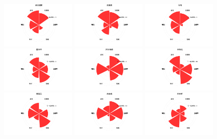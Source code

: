 \documentclass[12pt,a4paper,onecolumn]{article}
\begin{document}
\begin{figure}[H]
\centering
\includegraphics[width=100pt]{前锋苏亚雷斯.pdf}
\includegraphics[width=100pt]{前锋范佩西.pdf}
\includegraphics[width=100pt]{前锋马塔.pdf}
\includegraphics[width=100pt]{前锋霍尔特.pdf}
\includegraphics[width=100pt]{中场阿尔特塔.pdf}
\includegraphics[width=100pt]{中场本特克.pdf}
\includegraphics[width=100pt]{中场费莱尼.pdf}
\includegraphics[width=100pt]{中场杰拉德.pdf}
\includegraphics[width=100pt]{后卫科林斯.pdf}

\end{figure}
\end{document}
